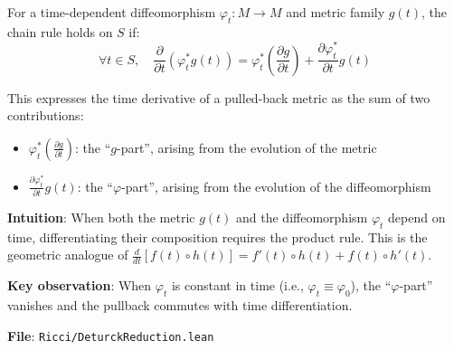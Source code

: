 \begin{definition}
\label{def:pullbackChainRuleOn}
For a time-dependent diffeomorphism $\varphi_t : M \to M$ and metric family $g(t)$, the chain rule holds on $S$ if:
\[ \forall t \in S, \quad \frac{\partial}{\partial t}(\varphi_t^* g(t)) = \varphi_t^*\left(\frac{\partial g}{\partial t}\right) + \frac{\partial \varphi_t^*}{\partial t}g(t) \]

This expresses the time derivative of a pulled-back metric as the sum of two contributions:
\begin{itemize}
\item $\varphi_t^*\left(\frac{\partial g}{\partial t}\right)$: the ``$g$-part'', arising from the evolution of the metric
\item $\frac{\partial \varphi_t^*}{\partial t}g(t)$: the ``$\varphi$-part'', arising from the evolution of the diffeomorphism
\end{itemize}

\textbf{Intuition}: When both the metric $g(t)$ and the diffeomorphism $\varphi_t$ depend on time, differentiating their composition requires the product rule. This is the geometric analogue of $\frac{d}{dt}[f(t) \circ h(t)] = f'(t) \circ h(t) + f(t) \circ h'(t)$.

\textbf{Key observation}: When $\varphi_t$ is constant in time (i.e., $\varphi_t \equiv \varphi_0$), the ``$\varphi$-part'' vanishes and the pullback commutes with time differentiation.

\textbf{File}: \texttt{Ricci/DeturckReduction.lean}
\end{definition}

